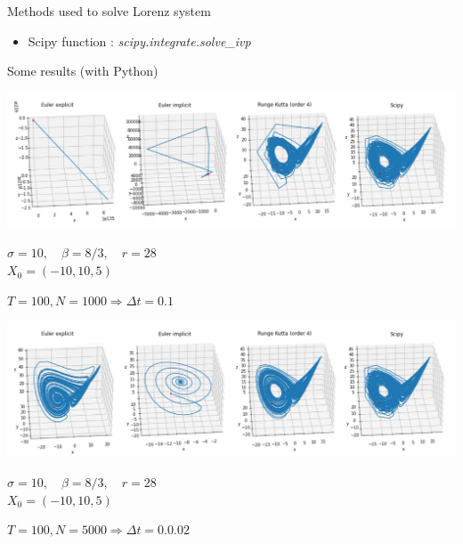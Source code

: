 \documentclass[10pt,xcolor={table,dvipsnames},t]{beamer}
\begin{document}
\begin{frame}[allowframebreaks]{Methods used to solve Lorenz system}
\begin{itemize}
			\item Scipy function : \qquad \textit{scipy.integrate.solve\_ivp}
		\end{itemize}
		
	\end{frame}
	
	\begin{frame}[allowframebreaks]{Some results (with Python)}
		
		\includegraphics[width=\textwidth]{images/N1000.png} \\ 
		\begin{center}
			\begin{minipage}[c]{0.5\linewidth}
				$\sigma=10,\quad \beta=8/3, \quad r=28$ \\
				$X_0=(-10,10,5)$ 
			\end{minipage}
			$T=100, N = 1000 \Rightarrow \Delta t=0.1$
		\end{center}
		
		\newpage
		
		\includegraphics[width=\textwidth]{images/N5000.png} \\ 
		\begin{center}
			\begin{minipage}[c]{0.5\linewidth}
				$\sigma=10,\quad \beta=8/3, \quad r=28$ \\
				$X_0=(-10,10,5)$ 
			\end{minipage}
			$T=100, N = 5000 \Rightarrow \Delta t=0.0.02$
		\end{center}
		
		\newpage
		

\end{frame}
\end{document}

